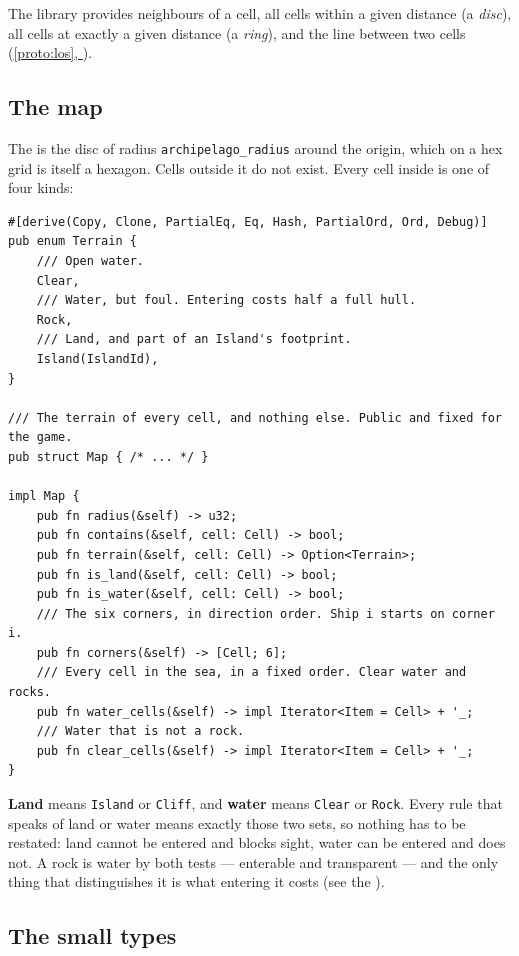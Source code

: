 \documentclass{article}
\newcommand{\fullref}[1]{\hyperref[#1]{\cref*{#1}, \nameref*{#1}}}
\begin{document}
The library provides neighbours of a cell, all cells within a given distance (a \emph{disc}), all
cells at exactly a given distance (a \emph{ring}), and the line between two cells
(\fullref{proto:los}).

\subsection{The map}
\label{proto:map}

The \archipelago{} is the disc of radius \texttt{archipelago\_radius} around the origin, which on
a hex grid is itself a hexagon. Cells outside it do not exist. Every cell inside is one of four
kinds:

\begin{lstlisting}
#[derive(Copy, Clone, PartialEq, Eq, Hash, PartialOrd, Ord, Debug)]
pub enum Terrain {
    /// Open water.
    Clear,
    /// Water, but foul. Entering costs half a full hull.
    Rock,
    /// Land, and part of an Island's footprint.
    Island(IslandId),
}

/// The terrain of every cell, and nothing else. Public and fixed for the game.
pub struct Map { /* ... */ }

impl Map {
    pub fn radius(&self) -> u32;
    pub fn contains(&self, cell: Cell) -> bool;
    pub fn terrain(&self, cell: Cell) -> Option<Terrain>;
    pub fn is_land(&self, cell: Cell) -> bool;
    pub fn is_water(&self, cell: Cell) -> bool;
    /// The six corners, in direction order. Ship i starts on corner i.
    pub fn corners(&self) -> [Cell; 6];
    /// Every cell in the sea, in a fixed order. Clear water and rocks.
    pub fn water_cells(&self) -> impl Iterator<Item = Cell> + '_;
    /// Water that is not a rock.
    pub fn clear_cells(&self) -> impl Iterator<Item = Cell> + '_;
}
\end{lstlisting}

\textbf{Land} means \texttt{Island} or \texttt{Cliff}, and \textbf{water} means \texttt{Clear} or
\texttt{Rock}. Every rule that speaks of land or water means exactly those two sets, so nothing
has to be restated: land cannot be entered and blocks sight, water can be entered and does not. A
rock is water by both tests --- enterable and transparent --- and the only thing that
distinguishes it is what entering it costs (see the \MD).

\subsection{The small types}
\label{proto:types}
\end{document}
